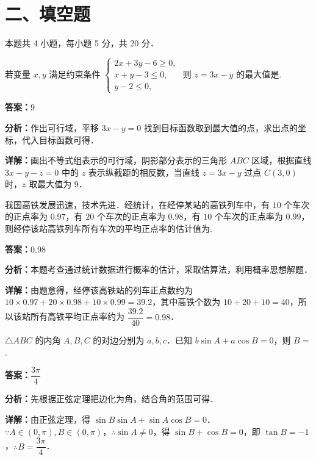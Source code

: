 \section*{二、填空题}
本题共 4 小题，每小题 5 分，共 20 分．

\begin{question}[points=5]
若变量 $x,y$ 满足约束条件 $\begin{cases}2x+3y-6\ge 0,\\ x+y-3\le 0,\\ y-2\le 0,\end{cases}$ 则 $z=3x-y$ 的最大值是.
\fillin[{$9$}]
\begin{solution}
\textbf{答案：}$9$

\textbf{分析：}作出可行域，平移 $3x-y=0$ 找到目标函数取到最大值的点，求出点的坐标，代入目标函数可得．

\textbf{详解：}画出不等式组表示的可行域，阴影部分表示的三角形 $ABC$ 区域，根据直线 $3x-y-z=0$ 中的 $z$ 表示纵截距的相反数，当直线 $z=3x-y$ 过点 $C(3,0)$ 时，$z$ 取最大值为 $9$．
\end{solution}
\end{question}

\begin{question}[points=5]
我国高铁发展迅速，技术先进．经统计，在经停某站的高铁列车中，有 $10$ 个车次的正点率为 $0.97$，有 $20$ 个车次的正点率为 $0.98$，有 $10$ 个车次的正点率为 $0.99$，则经停该站高铁列车所有车次的平均正点率的估计值为.
\fillin[{$0.98$}]
\begin{solution}
\textbf{答案：}$0.98$

\textbf{分析：}本题考查通过统计数据进行概率的估计，采取估算法，利用概率思想解题．

\textbf{详解：}由题意得，经停该高铁站的列车正点数约为 $10\times0.97+20\times0.98+10\times0.99=39.2$，其中高铁个数为 $10+20+10=40$，所以该站所有高铁平均正点率约为 $\dfrac{39.2}{40}=0.98$．
\end{solution}
\end{question}

\begin{question}[points=5]
$\triangle ABC$ 的内角 $A,B,C$ 的对边分别为 $a,b,c$．已知 $b\sin A+a\cos B=0$，则 $B=$.
\fillin[{$\dfrac{3\pi}{4}$}]
\begin{solution}
\textbf{答案：}$\dfrac{3\pi}{4}$

\textbf{分析：}先根据正弦定理把边化为角，结合角的范围可得．

\textbf{详解：}由正弦定理，得 $\sin B\sin A+\sin A\cos B=0$．$\because A\in(0,\pi),B\in(0,\pi)$，$\therefore \sin A\neq 0$，得 $\sin B+\cos B=0$，即 $\tan B=-1$，$\therefore B=\dfrac{3\pi}{4}$．
\end{solution}
\end{question}

